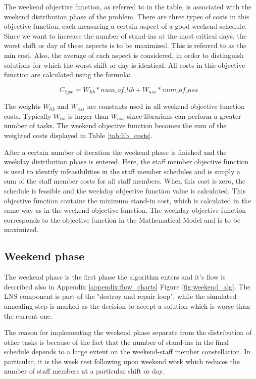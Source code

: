 The weekend objective function, as referred to in the table, is associated with the weekend distribution phase of the problem. There are three types of costs in this objective function, each measuring a certain aspect of a good weekend schedule. Since we want to increase the number of stand-ins at the most critical days, the worst shift or day of these aspects is to be maximized. This is referred to as the min cost. Also, the average of each aspect is considered, in order to distinguish solutions for which the worst shift or day is identical. All costs in this objective function are calculated using the formula:

\begin{equation}
\label{eq:wend_cost_calc}
C_{type} = W_{lib}*num\_of\_lib + W_{ass}*num\_of\_ass
\end{equation}

The weights $W_{lib}$ and $W_{ass}$ are constants used in all weekend objective function costs. Typically $W_{lib}$ is larger than $W_{ass}$ since librarians can perform a greater number of tasks. The weekend objective function becomes the sum of the weighted costs displayed in Table \ref{tab:lib_costs}. 

After a certain number of iteration the weekend phase is finished and the weekday distribution phase is entered. Here, the staff member objective function is used to identify infeasibilities in the staff member schedules and is simply a sum of the staff member costs for all staff members. When this cost is zero, the schedule is feasible and the weekday objective function value is calculated. This objective function contains the minimum stand-in cost, which is calculated in the same way as in the weekend objective function. The weekday objective function corresponds to the objective function in the Mathematical Model and is to be maximized.

\subsection{Weekend phase}

The weekend phase is the first phase the algorithm enters and it's flow is described also in Appendix \ref{appendix:flow_charts} Figure \ref{fig:weekend_alg}. The LNS component is part of the "destroy and repair loop", while the simulated annealing step is marked as the decision to accept a solution which is worse than the current one.

The reason for implementing the weekend phase separate from the distribution of other tasks is because of the fact that the number of stand-ins in the final schedule depends to a large extent on the weekend-staff member constellation. In particular, it is the week rest following upon weekend work which reduces the number of staff members at a particular shift or day. 


